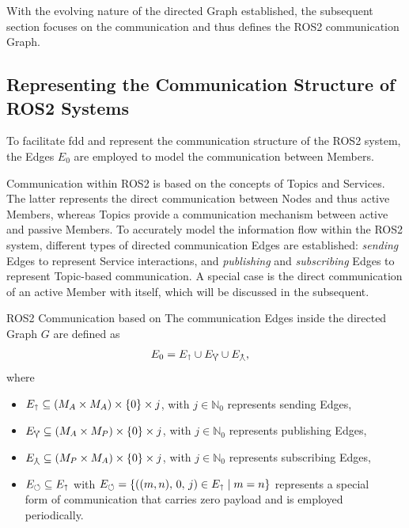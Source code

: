     With the evolving nature of the directed Graph established, the subsequent section focuses on the communication and thus defines the ROS2 communication Graph.


    \subsection{Representing the Communication Structure of ROS2 Systems} \label{subsec:mathModel:causalStructure}
    To facilitate \acl{fdd} and represent the communication structure of the ROS2 system, the Edges $E_0$ are employed to model the communication between Members.

    Communication within ROS2 is based on the concepts of Topics and Services. The latter represents the direct communication between Nodes and thus active Members, whereas Topics provide a communication mechanism between active and passive Members. To accurately model the information flow within the ROS2 system, different types of directed communication Edges are established: \emph{sending} Edges to represent Service interactions, and \emph{publishing} and \emph{subscribing} Edges to represent Topic-based communication. A special case is the direct communication of an active Member with itself, which will be discussed in the subsequent.
    \begin{definitionbox}[label=def:ros2communication, list text={ROS2 Communication}]{ROS2 Communication based on \Textcite[p.~3]{adaPaper}}{}
        The communication Edges inside the directed Graph $G$ are defined as
        \begin{align*}
            E_0 &= E_{\text{$\shortuparrow$}} \cup E_{\text{$\curlyveeuparrow$}} \cup E_{\text{$\curlywedgeuparrow$}}\text{,}
        \end{align*}
        where
        \begin{itemize}[label=$\circ$]
            \item $E_{\text{$\shortuparrow$}} \subseteq (M_A \times M_A) \times \{0\} \times j$, with $j\in\mathbb{N}_0$ represents sending Edges,
            \item $E_{\text{$\curlyveeuparrow$}} \subseteq (M_A \times M_P) \times \{0\} \times j$, with $j\in\mathbb{N}_0$ represents publishing Edges,
            \item $E_{\text{$\curlywedgeuparrow$}} \subseteq (M_P \times M_A) \times \{0\} \times j$, with $j\in\mathbb{N}_0$ represents subscribing Edges,
            \item $E_{\text{$\circlearrowleft$}} \subseteq E_{\text{$\shortuparrow$}}$ with $E_{\text{$\circlearrowleft$}}=\{((m,n),\,0,\,j) \in E_{\text{$\shortuparrow$}} \mid m=n\}$ represents a special\\form of communication that carries zero payload and is employed periodically.
        \end{itemize}
    \end{definitionbox}

